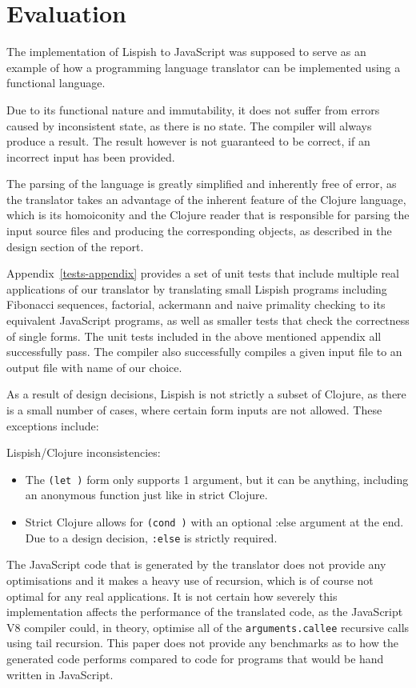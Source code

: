 \chapter{Evaluation}
The implementation of Lispish to JavaScript was supposed to serve as an example of how a programming language translator can be implemented using a functional language.

Due to its functional nature and immutability, it does not suffer from errors caused by inconsistent state, as there is no state. The compiler will always produce a result. The result however is not guaranteed to be correct, if an incorrect input has been provided.

The parsing of the language is greatly simplified and inherently free of error, as the translator takes an advantage of the inherent feature of the Clojure language, which is its homoiconity and the Clojure reader that is responsible for parsing the input source files and producing the corresponding objects, as described in the design section of the report.

Appendix~\ref{tests-appendix} provides a set of unit tests that include multiple real applications of our translator by translating small Lispish programs including Fibonacci sequences, factorial, ackermann and naive primality checking to its equivalent JavaScript programs, as well as smaller tests that check the correctness of single forms.
The unit tests included in the above mentioned appendix all successfully pass.
The compiler also successfully compiles a given input file to an output file with name of our choice. 

As a result of design decisions, Lispish is not strictly a subset of Clojure, as there is a small number of cases, where certain form inputs are not allowed.
These exceptions include:

\noindent Lispish/Clojure inconsistencies:

\begin{itemize}
\item The \texttt{(let )} form only supports 1 argument, but it can be anything, including an anonymous function just like in strict Clojure.
\item Strict Clojure allows for \texttt{(cond )} with an optional :else argument at the end. Due to a design decision, \texttt{:else} is strictly required.
\end{itemize}


The JavaScript code that is generated by the translator does not provide any optimisations and it makes a heavy use of recursion, which is of course not optimal for any real applications. 
It is not certain how severely this implementation affects the performance of the translated code, as the JavaScript V8 compiler could, in theory, optimise all of the \texttt{arguments.callee} recursive calls using tail recursion. 
This paper does not provide any benchmarks as to how the generated code performs compared to code for programs that would be hand written in JavaScript. 

